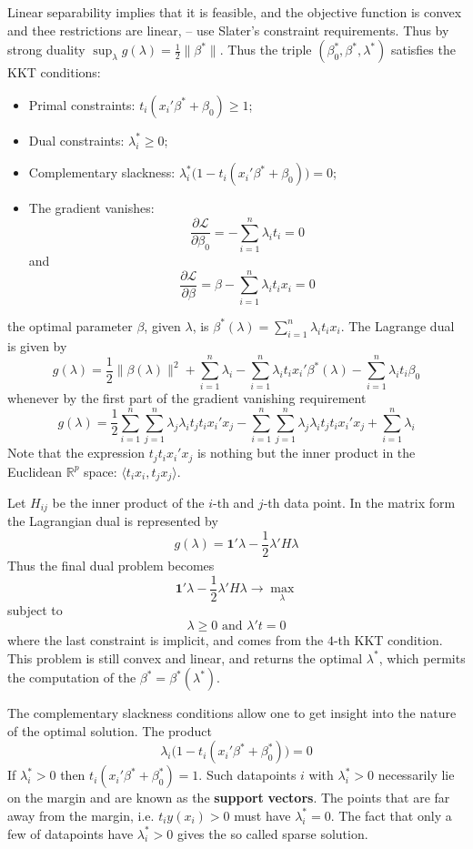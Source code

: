 \documentclass[a4paper]{article}
\newcommand{\Real}{\mathbb{R}}
\newcommand{\Lcal}{\mathcal{L}}
\newcommand{\one}{\mathbf{1}}
\begin{document}
Linear separability implies that it is feasible, and the objective function is
convex and thee restrictions are linear, -- use Slater's constraint requirements.
Thus by strong duality $\sup_\lambda g(\lambda) = \frac{1}{2} \|\beta^*\|$.
Thus the triple $(\beta_0^*,\beta^*,\lambda^*)$ satisfies the KKT conditions:\begin{itemize}
	\item Primal constraints: $t_i(x_i'\beta^*+\beta_0)\geq1$;
	\item Dual constraints: $\lambda^*_i\geq 0$;
	\item Complementary slackness: $\lambda^*_i \bigl( 1 - t_i(x_i'\beta^*+\beta_0) \bigr) = 0$;
	\item The gradient vanishes:
	\[ \frac{\partial \Lcal}{\partial \beta_0} = - \sum_{i=1}^n \lambda_i t_i = 0 \]
	and
	\[ \frac{\partial \Lcal}{\partial \beta} = \beta - \sum_{i=1}^n \lambda_i t_i x_i = 0 \]
\end{itemize}
the optimal parameter $\beta$, given $\lambda$, is $\beta^*(\lambda) = \sum_{i=1}^n \lambda_i t_i x_i$.
The Lagrange dual is given by
\[
g(\lambda)
= \frac{1}{2}\|\beta(\lambda)\|^2
+ \sum_{i=1}^n \lambda_i
- \sum_{i=1}^n \lambda_i t_i x_i'\beta^*(\lambda)
- \sum_{i=1}^n \lambda_i t_i \beta_0
\]
whenever by the first part of the gradient vanishing requirement
\[
g(\lambda)
= \frac{1}{2} \sum_{i=1}^n \sum_{j=1}^n \lambda_j \lambda_i t_j t_i x_i'x_j
- \sum_{i=1}^n \sum_{j=1}^n \lambda_j \lambda_i t_j t_i x_i' x_j
+ \sum_{i=1}^n \lambda_i
\]
Note that the expression $t_j t_i x_i' x_j$ is nothing but the inner product
in the Euclidean $\Real^p$ space: $\langle t_i x_i, t_j x_j\rangle$.

Let $H_{ij}$ be the inner product of the $i$-th and $j$-th data point. In the
matrix form the Lagrangian dual is represented by
\[
g(\lambda) = \one' \lambda - \frac{1}{2} \lambda'H\lambda
\]
Thus the final dual problem becomes
\[ \one' \lambda - \frac{1}{2} \lambda'H\lambda \to \max_{\lambda}\]
subject to 
\[ \lambda\geq 0 \text{ and } \lambda't = 0 \]
where the last constraint is implicit, and comes from the $4$-th KKT condition.
This problem is still convex and linear, and returns the optimal $\lambda^*$,
which permits the computation of the $\beta^* = \beta^*(\lambda^*)$.

The complementary slackness conditions allow one to get insight into the nature
of the optimal solution. The product
\[\lambda_i \bigl(1-t_i(x_i'\beta^*+\beta^*_0)\bigr) = 0\]
If $\lambda^*_i >0$ then $t_i ( x_i'\beta^*+\beta^*_0) = 1$. Such datapoints $i$
with $\lambda^*_i>0$ necessarily lie on the margin and are known as the \textbf{support}
\textbf{vectors}. The points that are far away from the margin, i.e. $t_i y(x_i)>0$
must have $\lambda^*_i=0$. The fact that only a few of datapoints have $\lambda^*_i>0$
gives the so called sparse solution.
\end{document}
